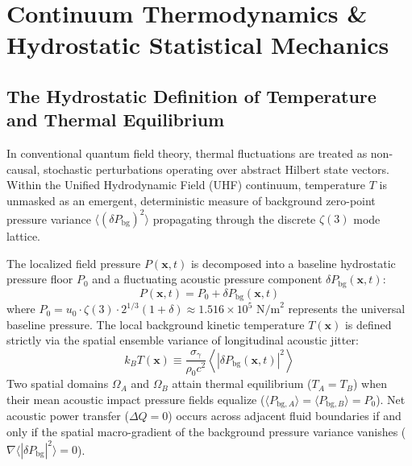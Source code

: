 \documentclass[11pt,a4paper]{article}
\begin{document}
	\section{Continuum Thermodynamics \& Hydrostatic Statistical Mechanics}
	
	\subsection{The Hydrostatic Definition of Temperature and Thermal Equilibrium}
	In conventional quantum field theory, thermal fluctuations are treated as non-causal, stochastic perturbations operating over abstract Hilbert state vectors. Within the Unified Hydrodynamic Field (UHF) continuum, temperature $T$ is unmasked as an emergent, deterministic measure of background zero-point pressure variance $\langle (\delta P_{\text{bg}})^2 \rangle$ propagating through the discrete $\zeta(3)$ mode lattice.
	
	The localized field pressure $P(\mathbf{x}, t)$ is decomposed into a baseline hydrostatic pressure floor $P_0$ and a fluctuating acoustic pressure component $\delta P_{\text{bg}}(\mathbf{x}, t)$:
	\begin{equation}
		P(\mathbf{x}, t) = P_0 + \delta P_{\text{bg}}(\mathbf{x}, t)
	\end{equation}
	where $P_0 = u_0 \cdot \zeta(3) \cdot 2^{1/3}(1+\delta) \approx 1.516 \times 10^5 \text{ N/m}^2$ represents the universal baseline pressure. The local background kinetic temperature $T(\mathbf{x})$ is defined strictly via the spatial ensemble variance of longitudinal acoustic jitter:
	\begin{equation}
		k_B T(\mathbf{x}) \equiv \frac{\sigma_{\gamma}}{\rho_0 c^2} \left\langle \left| \delta P_{\text{bg}}(\mathbf{x}, t) \right|^2 \right\rangle
	\end{equation}
	Two spatial domains $\Omega_A$ and $\Omega_B$ attain thermal equilibrium ($T_A = T_B$) when their mean acoustic impact pressure fields equalize ($\langle P_{\text{bg}, A} \rangle = \langle P_{\text{bg}, B} \rangle = P_0$). Net acoustic power transfer ($\Delta Q = 0$) occurs across adjacent fluid boundaries if and only if the spatial macro-gradient of the background pressure variance vanishes ($\nabla \langle |\delta P_{\text{bg}}|^2 \rangle = 0$).
	
\end{document}
